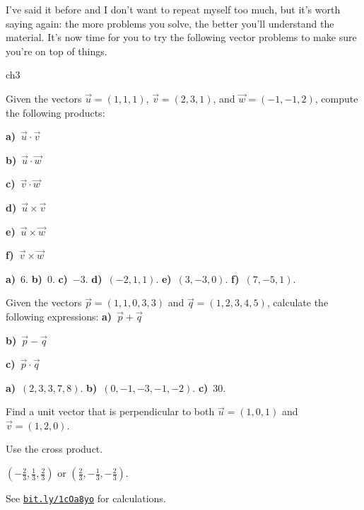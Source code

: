 I've said it before and I don't want to repeat myself too much,
but it's worth saying again: the more problems you solve, the better you'll understand the material.
It's now time for you to try the following vector problems to make sure you're on top of things.

\medskip

{ \small

\begin{problems}{ch3}

	\begin{problem}
		Given the vectors $\vec{u}=(1,1,1)$, $\vec{v} = (2,3,1)$, and $\vec{w}=(-1,-1,2)$,
		compute the following products:
		
		\threecol
			\textbf{a)}~$\vec{u} \cdot \vec{v}$

			\textbf{b)}~$\vec{u} \cdot \vec{w}$
			
			\textbf{c)}~$\vec{v} \cdot \vec{w}$
		\endthreecol
		
		\threecol
			\textbf{d)}~$\vec{u} \times \vec{v}$

			\textbf{e)}~$\vec{u} \times \vec{w}$
			
			\textbf{f)}~$\vec{v} \times \vec{w}$
		\endthreecol
		
		\begin{answer}\textbf{a)}~$6$.
					\textbf{b)}~$0$.
					\textbf{c)}~$-3$.
					\textbf{d)}~$(-2, 1, 1)$.
					\textbf{e)}~$(3, -3, 0)$.
					\textbf{f)}~$(7, -5, 1)$.\end{answer}
	\end{problem}


	\begin{problem}
		Given the vectors $\vec{p} =(1,1,0,3,3)$ and $\vec{q}=(1,2,3,4,5)$, calculate the following expressions:
		\threecol
			\textbf{a)}~$\vec{p}+\vec{q}$
			
			\textbf{b)}~$\vec{p}-\vec{q}$
			
			\textbf{c)}~$\vec{p} \cdot \vec{q}$
		\endthreecol
		
		\begin{answer}\textbf{a)}~$(2,3,3,7,8)$.
					\textbf{b)}~$(0,-1,-3,-1,-2)$.
					\textbf{c)}~$30$.\end{answer}
	\end{problem}


	\begin{problem}
		Find a unit vector that is perpendicular to both  $\vec{u}=(1, 0, 1)$ and $\vec{v} =(1, 2, 0)$.
		\begin{hint}
			Use the cross product.
		\end{hint}
		\begin{answer}$(-\frac{2}{3}, \frac{1}{3}, \frac{2}{3})$ or $(\frac{2}{3}, -\frac{1}{3}, -\frac{2}{3})$.\end{answer}
		\begin{solution}See \href{http://bit.ly/1cOa8yo}{\texttt{bit.ly/1cOa8yo}} for calculations.
		\end{solution}
	\end{problem}


\end{problems}}
